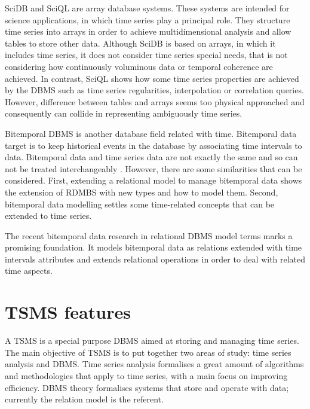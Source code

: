 SciDB \cite{stonebraker09:scidb} and SciQL \cite{zhang11} are array
database systems. These systems are intended for science applications,
in which time series play a principal role. They structure time series
into arrays in order to achieve multidimensional analysis and allow
tables to store other data.  Although SciDB is based on arrays, in
which it includes time series, it does not consider time series
special needs, that is not considering how continuously voluminous
data or temporal coherence are achieved.  In contrast, SciQL shows how
some time series properties are achieved by the DBMS such as time
series regularities, interpolation or correlation queries.  However,
difference between tables and arrays seems too physical approached and
consequently can collide in representing ambiguously time series.

Bitemporal DBMS is another database field related with
time. Bitemporal data target is to keep historical events
in the database by associating time intervals to data.  Bitemporal
data and time series data are not exactly the same and so can not be
treated interchangeably \cite{schmidt95}. However, there are some
similarities %
that can be considered. First, extending a relational model
to manage bitemporal data shows the extension of RDMBS with new types
and how to model them. Second, bitemporal data modelling settles some
time-related concepts that can be extended to time series.

The recent bitemporal data research in relational DBMS model terms
\cite{date02:_tempor_data_relat_model} marks a promising
foundation. It models bitemporal data as relations extended with time
intervals attributes and extends relational operations in order to
deal with related time aspects.





\section{TSMS features}
\label{sec:tsms-features}

A TSMS is a special purpose DBMS aimed at storing and managing time
series. The main objective of TSMS is to put together two areas of
study: time series analysis and DBMS.  Time series analysis formalises
a great amount of algorithms and methodologies that apply to time
series, with a main focus on improving efficiency. DBMS theory
formalises systems that store and operate with data; currently the
relation model \cite{date:introduction} is the referent.

